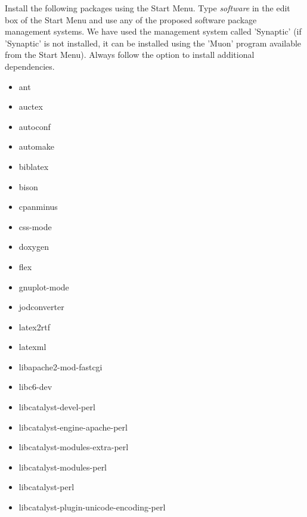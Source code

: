 \documentclass[12pt]{article}
\begin{document}
Install the following packages using the Start Menu.  Type
  {\it software} in the edit box of the Start Menu and use any of the
  proposed software package management systems.  We have used the
  management system called 'Synaptic' (if 'Synaptic' is not installed,
  it can be installed using the 'Muon' program available from the
  Start Menu).  Always follow the option to install additional
  dependencies.
  \begin{itemize}
  \item ant
  \item auctex
  \item autoconf
  \item automake
  \item biblatex
  \item bison
  \item cpanminus
  \item css-mode
  \item doxygen
  \item flex
  \item gnuplot-mode
  \item jodconverter
  \item latex2rtf
  \item latexml
  \item libapache2-mod-fastcgi
  \item libc6-dev
  \item libcatalyst-devel-perl
  \item libcatalyst-engine-apache-perl
  \item libcatalyst-modules-extra-perl
  \item libcatalyst-modules-perl
  \item libcatalyst-perl

  \item libcatalyst-plugin-unicode-encoding-perl


\end{itemize}
\end{document}
